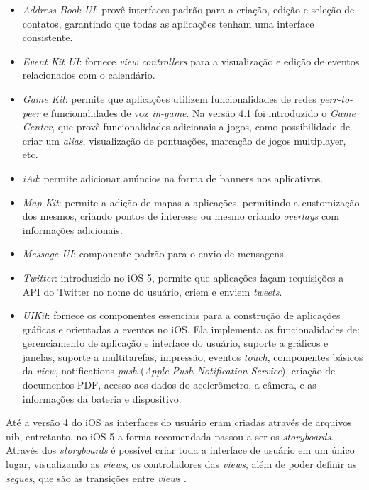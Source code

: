 \documentclass[diss]{template/setrem}
\begin{document}
\begin{itemize}
	\item \emph{Address Book UI}: provê interfaces padrão para a criação, edição e seleção de contatos, garantindo que todas as aplicações tenham uma interface consistente.
	\item \emph{Event Kit UI}: fornece \emph{view controllers} para a visualização e edição de eventos relacionados com o calendário.
	\item \emph{Game Kit}: permite que aplicações utilizem funcionalidades de redes \emph{perr-to-peer} e funcionalidades de voz \emph{in-game}. Na versão 4.1 foi introduzido o \emph{Game Center}, que provê funcionalidades adicionais a jogos, como possibilidade de criar um \emph{alias}, visualização de pontuações, marcação de jogos multiplayer, etc.
	\item \emph{iAd}: permite adicionar anúncios na forma de banners nos aplicativos.
	\item \emph{Map Kit}: permite a adição de mapas a aplicações, permitindo a customização dos mesmos, criando pontos de interesse ou mesmo criando \emph{overlays} com informações adicionais.
	\item \emph{Message UI}: componente padrão para o envio de mensagens.
	\item \emph{Twitter}: introduzido no iOS 5, permite que  aplicações façam requisições a API do Twitter no nome do usuário, criem e enviem \emph{tweets}.
	\item \emph{UIKit}: fornece os componentes essenciais para a construção de aplicações gráficas e orientadas a eventos no iOS. Ela implementa as funcionalidades de: gerenciamento de aplicação e interface do usuário, suporte a gráficos e janelas, suporte a multitarefas, impressão, eventos \emph{touch}, componentes básicos da \emph{view}, notifications \emph{push} (\emph{Apple Push Notification Service}), criação de documentos PDF, acesso aos dados do acelerômetro, a câmera, e as informações da bateria e dispositivo.
\end{itemize}

Até a versão 4 do iOS as interfaces do usuário eram criadas através de arquivos nib, entretanto, no iOS 5 a forma recomendada passou a ser os \emph{storyboards}. Através dos \emph{storyboards} é possível criar toda a interface de usuário em um único lugar, visualizando as \emph{views}, os controladores das \emph{views}, além de poder definir as \emph{segues}, que são as transições entre \emph{views} \citep{Apple2011}.
\end{document}
